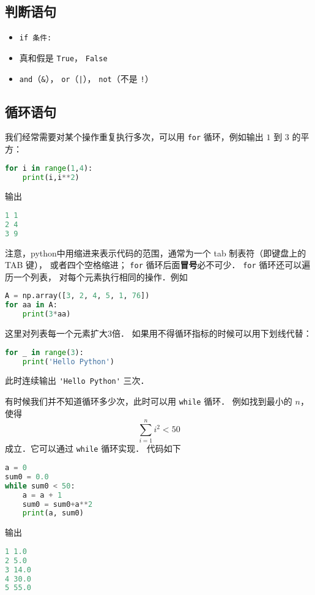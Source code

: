 

\subsection{判断语句}
\begin{itemize}
\item \verb|if 条件:|
\item 真和假是 \verb|True|， \verb|False|
\item \verb|and|（\verb|&|）， \verb|or|（\verb`|`）， \verb|not|（不是 \verb|!|）
\end{itemize}


\subsection{循环语句}
我们经常需要对某个操作重复执行多次，可以用 \verb|for| 循环，例如输出 $1$ 到 $3$ 的平方：
\begin{lstlisting}[language=python]
for i in range(1,4):
    print(i,i**2)
\end{lstlisting}
输出
\begin{lstlisting}[language=python]
1 1
2 4
3 9
\end{lstlisting}
注意，python中用缩进来表示代码的范围，通常为一个 tab 制表符（即键盘上的 TAB 键）， 或者四个空格缩进； \verb|for| 循环后面\textbf{冒号}必不可少． \verb|for| 循环还可以遍历一个列表， 对每个元素执行相同的操作．例如
\begin{lstlisting}[language=python]
A = np.array([3, 2, 4, 5, 1, 76])
for aa in A:
    print(3*aa)
\end{lstlisting}
这里对列表每一个元素扩大3倍． 如果用不得循环指标的时候可以用下划线代替：
\begin{lstlisting}[language=python]
for _ in range(3):
    print('Hello Python')
\end{lstlisting}
此时连续输出   \verb|'Hello Python'|  三次．

有时候我们并不知道循环多少次，此时可以用 \verb|while| 循环． 例如找到最小的 $n$，使得
\begin{equation}
\sum_{i=1}^n i^2<50
\end{equation}
成立．它可以通过 \verb|while| 循环实现． 代码如下
\begin{lstlisting}[language=python]
a = 0
sum0 = 0.0
while sum0 < 50:
    a = a + 1
    sum0 = sum0+a**2
    print(a, sum0)
\end{lstlisting}
输出
\begin{lstlisting}[language=python]
1 1.0
2 5.0
3 14.0
4 30.0
5 55.0
\end{lstlisting}


